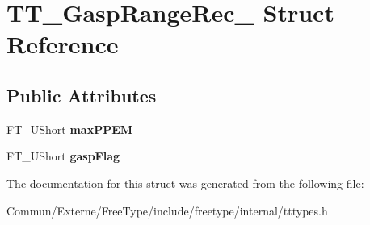 \hypertarget{struct_t_t___gasp_range_rec__}{}\section{T\+T\+\_\+\+Gasp\+Range\+Rec\+\_\+ Struct Reference}
\label{struct_t_t___gasp_range_rec__}
\subsection*{Public Attributes}
\begin{DoxyCompactItemize}
\item 
F\+T\+\_\+\+U\+Short {\bfseries max\+P\+P\+EM}\hypertarget{struct_t_t___gasp_range_rec___aa3fab31f6c0659b4deff402e210e15c9}{}\label{struct_t_t___gasp_range_rec___aa3fab31f6c0659b4deff402e210e15c9}

\item 
F\+T\+\_\+\+U\+Short {\bfseries gasp\+Flag}\hypertarget{struct_t_t___gasp_range_rec___a9fc298dc0e46d31507728ae25585118d}{}\label{struct_t_t___gasp_range_rec___a9fc298dc0e46d31507728ae25585118d}

\end{DoxyCompactItemize}


The documentation for this struct was generated from the following file\+:\begin{DoxyCompactItemize}
\item 
Commun/\+Externe/\+Free\+Type/include/freetype/internal/tttypes.\+h\end{DoxyCompactItemize}
